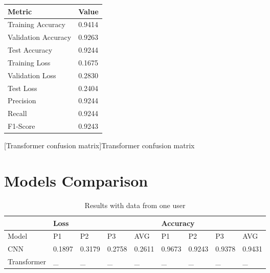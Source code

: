 \begin{minipage}{0.35\textwidth}
    \label{table:transformer_dataset2_results}
    \centering
    \begin{tabular}{ |p{3.4cm}|p{1.1cm}| }
    \hline
    Metric & Value\\
    \hline
    Training Accuracy &  0.9414\\
    \hline
    Validation Accuracy & 0.9263\\
    \hline
    Test Accuracy & 0.9244\\
    \hline
    Training Loss & 0.1675\\
    \hline
    Validation Loss & 0.2830\\
    \hline
    Test Loss & 0.2404\\
    \hline
    Precision & 0.9244\\
    \hline
    Recall & 0.9244\\
    \hline
    F1-Score & 0.9243\\
    \hline
    \end{tabular}
\end{minipage}%
\begin{minipage}{0.65\textwidth}
    \centering
    
    [Transformer confusion matrix]{Transformer confusion matrix}
    \label{fig:transformer_confusion_matrix}
\end{minipage}

\section{Models Comparison}

\begin{table}[H]
\caption{Results with data from one user}
\label{table:results_one_user}
\centering
\begin{tabular}{|l|l|l|l|l|l|l|l|l|} 
\hline
& \multicolumn{4}{|l|}{Loss} & \multicolumn{4}{|l|}{Accuracy} \\
\hline
Model & P1 & P2 & P3 & AVG & P1 & P2 & P3 & AVG \\
\hline
CNN & 0.1897 & 0.3179 & 0.2758 & 0.2611 & 0.9673 & 0.9243 & 0.9378 & 0.9431 \\
\hline
Transformer & \_ & \_ & \_ & \_ & \_ & \_ & \_ & \_ \\
\hline
\end{tabular}
\end{table}

